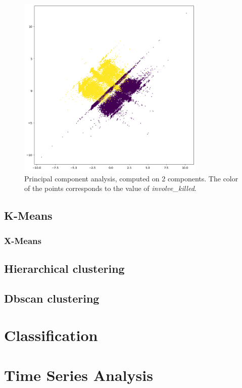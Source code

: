 \documentclass[10pt,a4paper]{report}
\begin{document}
\begin{figure}[h]
	\includegraphics[width=0.8\textwidth]{pca}
	\centering
	\caption{Principal component analysis, computed on 2 components.
	The color of the points corresponds to the value of \textit{involve\_killed}.}
	\label{pca}
\end{figure}

\section{K-Means}

\subsection{X-Means}

\section{Hierarchical clustering}

\section{Dbscan clustering}

\chapter{Classification}

\chapter{Time Series Analysis}
\end{document}
